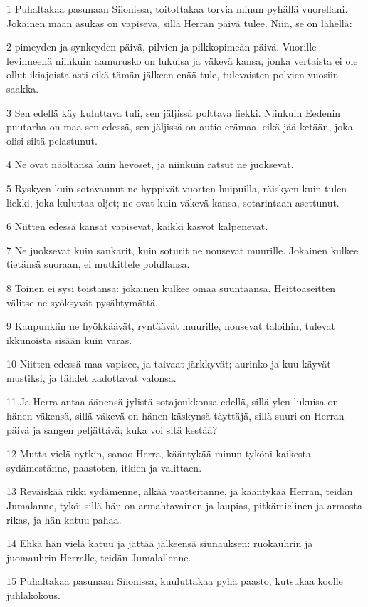 \par 1 Puhaltakaa pasunaan Siionissa, toitottakaa torvia minun pyhällä vuorellani. Jokainen maan asukas on vapiseva, sillä Herran päivä tulee. Niin, se on lähellä:
\par 2 pimeyden ja synkeyden päivä, pilvien ja pilkkopimeän päivä. Vuorille levinneenä niinkuin aamurusko on lukuisa ja väkevä kansa, jonka vertaista ei ole ollut ikiajoista asti eikä tämän jälkeen enää tule, tulevaisten polvien vuosiin saakka.
\par 3 Sen edellä käy kuluttava tuli, sen jäljissä polttava liekki. Niinkuin Eedenin puutarha on maa sen edessä, sen jäljissä on autio erämaa, eikä jää ketään, joka olisi siltä pelastunut.
\par 4 Ne ovat näöltänsä kuin hevoset, ja niinkuin ratsut ne juoksevat.
\par 5 Ryskyen kuin sotavaunut ne hyppivät vuorten huipuilla, räiskyen kuin tulen liekki, joka kuluttaa oljet; ne ovat kuin väkevä kansa, sotarintaan asettunut.
\par 6 Niitten edessä kansat vapisevat, kaikki kasvot kalpenevat.
\par 7 Ne juoksevat kuin sankarit, kuin soturit ne nousevat muurille. Jokainen kulkee tietänsä suoraan, ei mutkittele polullansa.
\par 8 Toinen ei sysi toistansa: jokainen kulkee omaa suuntaansa. Heittoaseitten välitse ne syöksyvät pysähtymättä.
\par 9 Kaupunkiin ne hyökkäävät, ryntäävät muurille, nousevat taloihin, tulevat ikkunoista sisään kuin varas.
\par 10 Niitten edessä maa vapisee, ja taivaat järkkyvät; aurinko ja kuu käyvät mustiksi, ja tähdet kadottavat valonsa.
\par 11 Ja Herra antaa äänensä jylistä sotajoukkonsa edellä, sillä ylen lukuisa on hänen väkensä, sillä väkevä on hänen käskynsä täyttäjä, sillä suuri on Herran päivä ja sangen peljättävä; kuka voi sitä kestää?
\par 12 Mutta vielä nytkin, sanoo Herra, kääntykää minun tyköni kaikesta sydämestänne, paastoten, itkien ja valittaen.
\par 13 Reväiskää rikki sydämenne, älkää vaatteitanne, ja kääntykää Herran, teidän Jumalanne, tykö; sillä hän on armahtavainen ja laupias, pitkämielinen ja armosta rikas, ja hän katuu pahaa.
\par 14 Ehkä hän vielä katuu ja jättää jälkeensä siunauksen: ruokauhrin ja juomauhrin Herralle, teidän Jumalallenne.
\par 15 Puhaltakaa pasunaan Siionissa, kuuluttakaa pyhä paasto, kutsukaa koolle juhlakokous.
